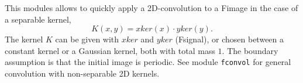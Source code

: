 This modules allows to quickly apply a 2D-convolution to a Fimage in the 
case of a separable kernel,
$$K(x,y)=xker(x)\cdot yker(y).$$
The kernel $K$ can be given with $xker$ and $yker$ (Fsignal), or 
chosen between a constant kernel or a Gaussian kernel, both
with total mass $1$. The boundary assumption is that the initial
image is periodic. See module \verb+fconvol+ for general
convolution with non-separable 2D kernels.

